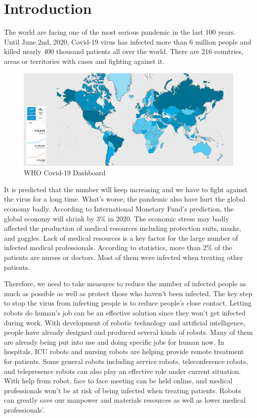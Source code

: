 \documentclass[a4paper]{article}
\begin{document}
\section{Introduction}
    The world are facing one of the most serious pandemic in the last 100 years. Until June.2nd, 2020, Covid-19 virus has infected more than 6 million people and killed nearly 400 thousand patients all over the world. There are 216 countries, areas or territories with cases and fighting against it\cite{1}.
\begin{figure}[H]
    \centering
    \includegraphics[scale=0.15]{map.png}
    \caption{WHO Covid-19 Dashboard}
    \label{Map}
\end{figure}
    It is predicted that the number will keep increasing and we have to fight against the virus for a long time. What's worse, the pandemic also have hurt the global economy badly. According to International Monetary Fund's prediction, the global economy will shrink by 3\% in 2020\cite{2}. The economic stress may badly affected the production of medical resources including protection suits, masks, and goggles. Lack of medical resources is a key factor for the large number of infected medical professionals. According to statistics, more than 2\% of the patients are nurses or doctors. Most of them were infected when treating other patients.
\par 
    Therefore, we need to take measures to reduce the number of infected people as much as possible as well as protect those who haven't been infected. The key step to stop the virus from infecting people is to reduce people's close contact. Letting robots do human's job can be an effective solution since they won't get infected during work. With development of robotic technology and artificial intelligence, people have already designed and produced several kinds of robots. Many of them are already being put into use and doing specific jobs for human now. In hospitals, ICU robots and nursing robots are helping provide remote treatment for patients. Some general robots including service robots, teleconference robots, and telepresence robots can also play an effective role under current situation. With help from robot, face to face meeting can be held online, and medical professionals won't be at risk of being infected when treating patients. Robots can greatly save our manpower and materials resources as well as lower medical professionals'.
\end{document}
